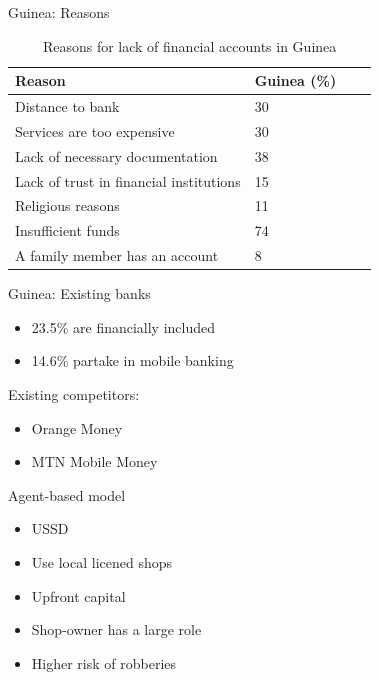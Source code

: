 \documentclass[10pt]{beamer}
\begin{document}
\begin{frame}{Guinea: Reasons}
\begin{table}[!ht]
\centering
\begin{tabular}{|l|l|l|l|}
\hline
\textbf{Reason} & \textbf{Guinea (\%)} \\ \hline
Distance to bank & 30\\ \hline
Services are too expensive & 30 \\ \hline
Lack of necessary documentation & 38 \\ \hline
Lack of trust in financial institutions & 15 \\ \hline
Religious reasons & 11 \\ \hline
Insufficient funds & 74 \\ \hline
A family member has an account & 8\\ \hline
\end{tabular}
\vspace{0.1cm}\caption{Reasons for lack of financial accounts in Guinea}
\end{table}
\end{frame}

\begin{frame}{Guinea: Existing banks}
\begin{itemize}
    \item 23.5\% are financially included
    \item 14.6\% partake in mobile banking
\end{itemize}
\vspace{0.4cm}
Existing competitors:

\begin{itemize}
    \item Orange Money
    \item MTN Mobile Money
\end{itemize}

\vspace{0.4cm}
Agent-based model
\begin{itemize}
\item USSD
\item Use local licened shops
\item Upfront capital
\item Shop-owner has a large role
\item Higher risk of robberies
\end{itemize}

\end{frame}
\end{document}
